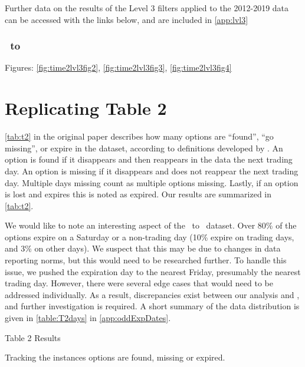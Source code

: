 \clearpage

Further data on the results of the Level 3 filters applied to the 2012-2019 data can be accessed with the links below, and are included in \autoref{app:lvl3}

\subsubsection{\STARTTWO\ to \ENDTWO }
Figures: \autoref{fig:time2lvl3fig2}, \autoref{fig:time2lvl3fig3}, \autoref{fig:time2lvl3fig4}


\clearpage

\section{Replicating Table 2}
\autoref{tab:t2} in the original paper describes how many options are ``found'', ``go missing'', or expire in the dataset, according to definitions developed by \citet{constantinides2013}. An option is found if it disappears and then reappears in the data the next trading day. An option is missing if it disappears and does not reappear the next trading day. Multiple days missing count as multiple options missing. Lastly, if an option is lost and expires this is noted as expired. Our results are summarized in \autoref{tab:t2}.

We would like to note an interesting aspect of the \STARTONE\ to \ENDONE\ dataset. Over 80\% of the options expire on a Saturday or a non-trading day (10\% expire on trading days, and 3\% on other days). We suspect that this may be due to changes in data reporting norms, but this would need to be researched further. To handle this issue, we pushed the expiration day to the nearest Friday, presumably the nearest trading day. However, there were several edge cases that would need to be addressed individually. As a result, discrepancies exist between our analysis and \citet{constantinides2013}, and further investigation is required. A short summary of the data distribution is given in \autoref{table:T2days} in \autoref{app:oddExpDates}. 

\newpage

\thispagestyle{empty}
\begin{landscape}

\begin{table}
   \centering
   \caption{Table 2 Results}    
  \resizebox{1.4\textwidth}{!}{
  \hspace*{-4cm}
    
    }
  \caption*{Tracking the instances options are found, missing or expired.}
\label{tab:t2}
\end{table}
\vfill
\raisebox{-6.5cm}{\makebox[\linewidth]{\thepage}}
\end{landscape}



